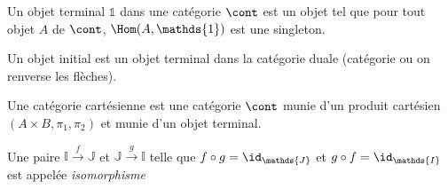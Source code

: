 \documentclass[math]{cours}
\begin{document}
\begin{definition}
	Un objet terminal $\mathds{1}$ dans une catégorie $\cont$ est un objet tel que pour tout objet $A$ de $\cont$, $\Hom(A, \mathds{1})$ est une singleton.
	\label{def:objterm}
\end{definition}
\begin{remarque}
	Un objet initial est un objet terminal dans la catégorie duale (catégorie ou on renverse les flèches).
\end{remarque}

\begin{definition}
	Une catégorie cartésienne est une catégorie $\cont$ munie d'un produit cartésien $\left(A\times B, \pi_{1}, \pi_{2}\right)$ et munie d'un objet terminal.
	\label{def:cartcat}
\end{definition}

\begin{definition}
	Une paire $\mathds{I} \xrightarrow{f} \mathds{J}$ et $\mathds{J} \xrightarrow{g} \mathds{I}$ telle que $f\circ g= \id_{\mathds{J}}$ et $g\circ f = \id_{\mathds{I}}$ est appelée \emph{isomorphisme}
	\label{def:isomorphisme}
\end{definition}
\end{document}
